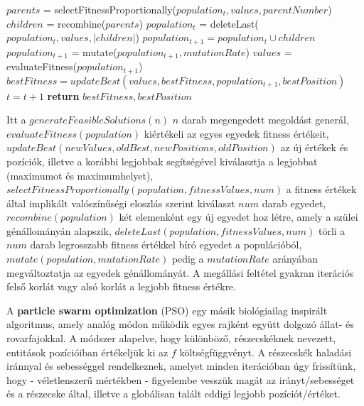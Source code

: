 \begin{algorithm}[H]
\begin{algorithmic}[1] %
	\STATE $parents$ = selectFitnessProportionally($population_t, values, parentNumber$)
	\STATE $children$ = recombine($parents$)
	\STATE $population_t$ = deleteLast($population_t, values, |children|$)
	\STATE $population_{t+1} = population_t \cup children$
	\STATE $population_{t+1}$ = mutate($population_{t+1}, mutationRate$)
	\STATE $values$ = evaluateFitness($population_{t+1}$)
	\STATE $bestFitness = updateBest(values, bestFitness, population_{t+1}, bestPosition)$
	\STATE $t = t + 1$
\ENDWHILE
\STATE \textbf{return} $bestFitness, bestPosition$
\end{algorithmic}
\end{algorithm}


Itt a $generateFeasibleSolutions(n)$ $n$ darab megengedett megoldást generál, $evaluateFitness(population)$ kiértékeli az egyes egyedek fitness értékeit, $updateBest(newValues, oldBest, newPositions, oldPosition)$ az új értékek és pozíciók, illetve a korábbi legjobbak segítségével kiválasztja a legjobbat (maximumot és maximumhelyet), $selectFitnessProportionally(population, fitnessValues, num)$ a fitness értékek által implikált valószínűségi eloszlás szerint kiválaszt $num$ darab egyedet, $recombine(population)$ két elemenként egy új egyedet hoz létre, amely a szülei génállományán alapszik, $deleteLast(population, fitnessValues, num)$ törli a $num$ darab legrosszabb fitness értékkel bíró egyedet a populációból, $mutate(population, mutationRate)$ pedig a $mutationRate$ arányában megváltoztatja az egyedek génállományát. A megállási feltétel gyakran iterációs felső korlát vagy alsó korlát a legjobb fitness értékre.


A \textbf{particle swarm optimization} (PSO) egy másik biológiailag inspirált algoritmus, amely analóg módon működik egyes rajként együtt dolgozó állat- és rovarfajokkal\cite{non_gradient_optimization, pso, modified_pso}. A módszer alapelve, hogy különböző, részecskéknek nevezett, entitások pozícióiban értékeljük ki az $f$ költségfüggvényt. A részecskék haladási iránnyal és sebességgel rendelkeznek, amelyet minden iterációban úgy frissítünk, hogy - véletlenszerű mértékben - figyelembe vesszük magát az irányt/sebességet és a részecske által, illetve a globálisan talált eddigi legjobb pozíciót/értéket.


